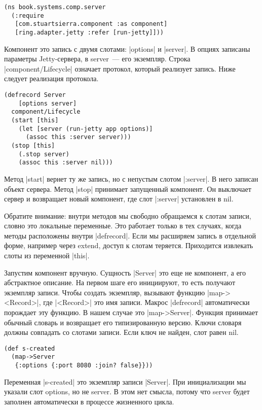 \begin{verbatim}
(ns book.systems.comp.server
  (:require
   [com.stuartsierra.component :as component]
   [ring.adapter.jetty :refer [run-jetty]]))
\end{verbatim}

Компонент это запись с двумя слотами: \spverb|options| и \spverb|server|. В опциях записаны
параметры Jetty-сервера, в server~--- его экземпляр. Строка \spverb|component/Lifecycle|
означает протокол, который реализует запись. Ниже следует реализация протокола.

\begin{verbatim}
(defrecord Server
    [options server]
  component/Lifecycle
  (start [this]
    (let [server (run-jetty app options)]
      (assoc this :server server)))
  (stop [this]
    (.stop server)
    (assoc this :server nil)))
\end{verbatim}

Метод \spverb|start| вернет ту же запись, но с непустым слотом \spverb|:server|. В него
записан объект сервера. Метод \spverb|stop| принимает запущенный компонент. Он
выключает сервер и возвращает новый компонент, где слот \spverb|:server| установлен в
nil.

Обратите внимание: внутри методов мы свободно обращаемся к слотам записи, словно
это локальные переменные. Это работает только в тех случаях, когда методы
расположены внутри \spverb|defrecord|. Если мы расширяем запись в отдельной форме,
например через extend, доступ к слотам теряется. Приходится извлекать слоты из
переменной \spverb|this|.

Запустим компонент вручную. Сущность \spverb|Server| это еще не компонент, а его
абстрактное описание. На первом шаге его инициируют, то есть получают экземпляр
записи. Чтобы создать экземпляр, вызывают функцию \spverb|map-><Record>|, где
\spverb|<Record>| это имя записи. Макрос \spverb|defrecord| автоматически порождает эту
функцию. В нашем случае это \spverb|map->Server|. Функция принимает обычный словарь и
возвращает его типизированную версию. Ключи словаря должны совпадать со слотами
записи. Если ключ не найден, слот равен nil.

\begin{verbatim}
(def s-created
  (map->Server
   {:options {:port 8080 :join? false}}))
\end{verbatim}

Переменная \spverb|s-created| это экземпляр записи \spverb|Server|. При инициализации мы
указали слот options, но не server. В этом нет смысла, потому что server будет
заполнен автоматически в процессе жизненного цикла.

